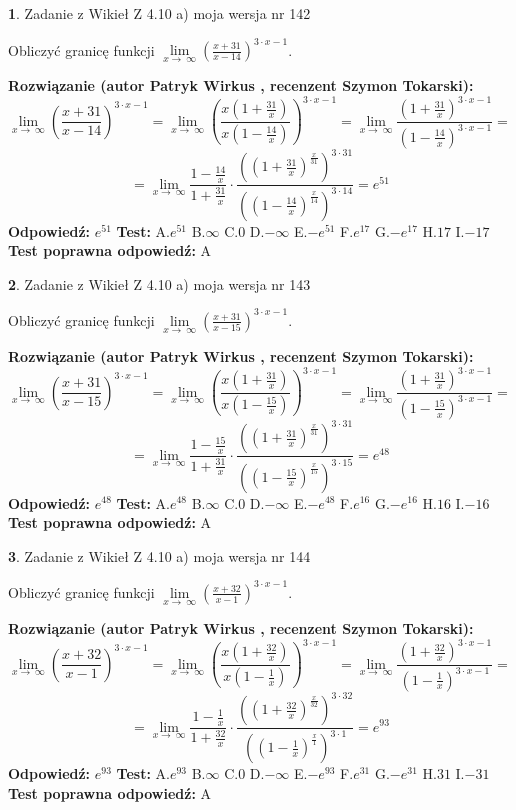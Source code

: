 \documentclass[12pt, a4paper]{article}
\theoremstyle{definition} %
\newtheorem{zad}{}
\newcommand{\zadStart}[1]{\begin{zad}#1\newline}
\newcommand{\zadStop}{\end{zad}}
\newcommand{\rozwStart}[2]{\noindent \textbf{Rozwiązanie (autor #1 , recenzent #2): }\newline}
\newcommand{\rozwStop}{\newline}
\newcommand{\odpStart}{\noindent \textbf{Odpowiedź:}\newline}
\newcommand{\odpStop}{\newline}
\newcommand{\testStart}{\noindent \textbf{Test:}\newline}
\newcommand{\testStop}{\newline}
\newcommand{\kluczStart}{\noindent \textbf{Test poprawna odpowiedź:}\newline}
\newcommand{\kluczStop}{\newline}
\begin{document}
\zadStart{Zadanie z Wikieł Z 4.10 a) moja wersja nr 142}

Obliczyć granicę funkcji  $\lim\limits_{x\to\ \infty}(\frac{x+31}{x-14})^{3\cdot x-1}$.
\zadStop
\rozwStart{Patryk Wirkus}{Szymon Tokarski}
$$\lim\limits_{x\to\ \infty}(\frac{x+31}{x-14})^{3\cdot x-1} = \lim\limits_{x\to\ \infty}(\frac{x(1+\frac{31}{x})}{x(1-\frac{14}{x})})^{3\cdot x-1}=\lim\limits_{x\to\ \infty}\frac{(1+\frac{31}{x})^{3\cdot x-1}}{(1-\frac{14}{x})^{3\cdot x-1}}=$$
$$=\lim\limits_{x\to\ \infty}\frac{1-\frac{14}{x}}{1+\frac{31}{x}}\cdot\frac{((1+\frac{31}{x})^{\frac{x}{31}})^{3\cdot31}}{((1-\frac{14}{x})^{\frac{x}{14}})^{3\cdot14}}=e^{51}$$
\rozwStop
\odpStart
$e^{51}$
\odpStop
\testStart
A.$e^{51}$ B.$\infty$ C.$0$ D.$-\infty$ E.$-e^{51}$
F.$e^{17}$ G.$-e^{17}$
H.$17$
I.$-17$
\testStop
\kluczStart
A
\kluczStop



\zadStart{Zadanie z Wikieł Z 4.10 a) moja wersja nr 143}

Obliczyć granicę funkcji  $\lim\limits_{x\to\ \infty}(\frac{x+31}{x-15})^{3\cdot x-1}$.
\zadStop
\rozwStart{Patryk Wirkus}{Szymon Tokarski}
$$\lim\limits_{x\to\ \infty}(\frac{x+31}{x-15})^{3\cdot x-1} = \lim\limits_{x\to\ \infty}(\frac{x(1+\frac{31}{x})}{x(1-\frac{15}{x})})^{3\cdot x-1}=\lim\limits_{x\to\ \infty}\frac{(1+\frac{31}{x})^{3\cdot x-1}}{(1-\frac{15}{x})^{3\cdot x-1}}=$$
$$=\lim\limits_{x\to\ \infty}\frac{1-\frac{15}{x}}{1+\frac{31}{x}}\cdot\frac{((1+\frac{31}{x})^{\frac{x}{31}})^{3\cdot31}}{((1-\frac{15}{x})^{\frac{x}{15}})^{3\cdot15}}=e^{48}$$
\rozwStop
\odpStart
$e^{48}$
\odpStop
\testStart
A.$e^{48}$ B.$\infty$ C.$0$ D.$-\infty$ E.$-e^{48}$
F.$e^{16}$ G.$-e^{16}$
H.$16$
I.$-16$
\testStop
\kluczStart
A
\kluczStop



\zadStart{Zadanie z Wikieł Z 4.10 a) moja wersja nr 144}

Obliczyć granicę funkcji  $\lim\limits_{x\to\ \infty}(\frac{x+32}{x-1})^{3\cdot x-1}$.
\zadStop
\rozwStart{Patryk Wirkus}{Szymon Tokarski}
$$\lim\limits_{x\to\ \infty}(\frac{x+32}{x-1})^{3\cdot x-1} = \lim\limits_{x\to\ \infty}(\frac{x(1+\frac{32}{x})}{x(1-\frac{1}{x})})^{3\cdot x-1}=\lim\limits_{x\to\ \infty}\frac{(1+\frac{32}{x})^{3\cdot x-1}}{(1-\frac{1}{x})^{3\cdot x-1}}=$$
$$=\lim\limits_{x\to\ \infty}\frac{1-\frac{1}{x}}{1+\frac{32}{x}}\cdot\frac{((1+\frac{32}{x})^{\frac{x}{32}})^{3\cdot32}}{((1-\frac{1}{x})^{\frac{x}{1}})^{3\cdot1}}=e^{93}$$
\rozwStop
\odpStart
$e^{93}$
\odpStop
\testStart
A.$e^{93}$ B.$\infty$ C.$0$ D.$-\infty$ E.$-e^{93}$
F.$e^{31}$ G.$-e^{31}$
H.$31$
I.$-31$
\testStop
\kluczStart
A
\kluczStop
\end{document}
